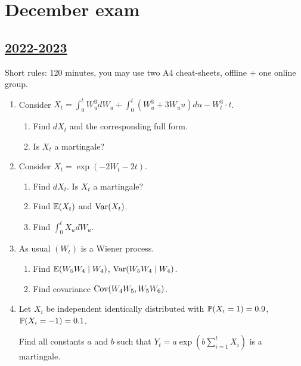 
\newpage
\thispagestyle{empty}
\section{December exam}
 
\subsection[2022-2023]{\hyperref[sec:sol_kr_02_2022_2023]{2022-2023}}
\label{sec:kr_02_2022_2023} %



Short rules: 120 minutes, you may use two A4 cheat-sheets, offline + one online group.

\begin{enumerate}

\item Consider $X_t = \int_0^t W_u^3 dW_u + \int_0^t (W_u^3 + 3W_u u ) du - W_t^3 \cdot t$.

\begin{enumerate}
    \item Find $dX_t$ and the corresponding full form. 
    \item Is $X_t$ a martingale?
\end{enumerate}

\item Consider $X_t = \exp(-2W_t - 2t)$.
\begin{enumerate}
    \item Find $dX_t$. Is $X_t$ a martingale?
    \item Find $\E(X_t)$ and $\Var(X_t)$.
    \item Find $\int_0^t X_u dW_u$.
\end{enumerate}

\newpage 

\item As usual $(W_t)$ is a Wiener process.
\begin{enumerate}
    \item Find $\E(W_5 W_4 \mid W_4)$, $\Var(W_5 W_4 \mid W_4)$.
    \item Find covariance $\Cov(W_4 W_5, W_5 W_6)$.
\end{enumerate}

\item Let $X_i$ be independent identically distributed with $\P(X_i = 1) = 0.9$, $\P(X_i = -1 ) = 0.1$. 

Find all constants $a$ and $b$ such that $Y_t = a \exp\left(b\sum_{i=1}^t X_i\right)$ is a martingale. 


\end{enumerate}
